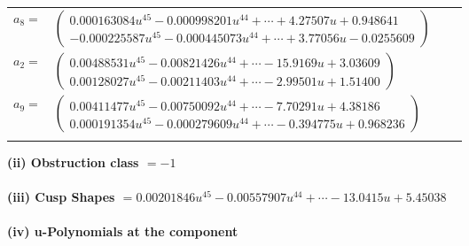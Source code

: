 \documentclass[1p]{elsarticle_modified}
\theoremstyle{definition}
\begin{document}
\begin{tabular}{m{7pt} m{180pt} m{7pt} m{180pt} }
\flushright $a_{8}=$&$\begin{pmatrix}0.000163084 u^{45}-0.000998201 u^{44}+\cdots+4.27507 u+0.948641\\-0.000225587 u^{45}-0.000445073 u^{44}+\cdots+3.77056 u-0.0255609\end{pmatrix}$ \\
\flushright $a_{2}=$&$\begin{pmatrix}0.00488531 u^{45}-0.00821426 u^{44}+\cdots-15.9169 u+3.03609\\0.00128027 u^{45}-0.00211403 u^{44}+\cdots-2.99501 u+1.51400\end{pmatrix}$ \\
\flushright $a_{9}=$&$\begin{pmatrix}0.00411477 u^{45}-0.00750092 u^{44}+\cdots-7.70291 u+4.38186\\0.000191354 u^{45}-0.000279609 u^{44}+\cdots-0.394775 u+0.968236\end{pmatrix}$\\&\end{tabular}
\flushleft \textbf{(ii) Obstruction class $= -1$}\\~\\
\flushleft \textbf{(iii) Cusp Shapes $= 0.00201846 u^{45}-0.00557907 u^{44}+\cdots-13.0415 u+5.45038$}\\~\\
\newpage\renewcommand{\arraystretch}{1}
\flushleft \textbf{(iv) u-Polynomials at the component}\newline \\
\end{document}
